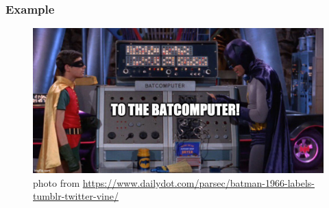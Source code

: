 \documentclass[
  shownotes,
  xcolor={svgnames},
  hyperref={colorlinks,citecolor=DarkBlue,linkcolor=andesred,urlcolor=DarkBlue}
  , aspectratio=169]{beamer}
\begin{document}
\begin{frame}[fragile]
\frametitle{Example}
\begin{figure}[H] \centering
  \centering
  \includegraphics[scale=0.35]{figures/baticomputer_meme.jpg}
  \\
  \tiny photo from \url{https://www.dailydot.com/parsec/batman-1966-labels-tumblr-twitter-vine/}
\end{figure}

 \end{frame}


\end{document}
